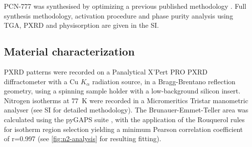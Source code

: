 PCN-777 was synthesised by optimizing a previous published methodology
\citep{fengHighlyStableZeotype2015}. Full synthesis methodology, activation
procedure and phase purity analysis using TGA, PXRD and  physisorption
are given in the SI.

\subsection{Material characterization}\label{methodology-characterization}

PXRD patterns were recorded on a Panalytical X'Pert PRO PXRD diffractometer with
a Cu \(K_{\alpha}\) radiation source, in a Bragg-Brentano reflection geometry,
using a spinning sample holder with a low-background silicon insert. Nitrogen
isotherms at \SI{77}{\kelvin} were recorded in a Micromeritics Tristar
manometric analyser (see SI for detailed methodology). The Brunauer-Emmet-Teller
area was calculated using the pyGAPS suite
\citep{iacomiPyGAPSPythonbasedFramework2019}, with the application of the
Rouquerol rules for isotherm region selection yielding a minimum Pearson
correlation coefficient of r=0.997 (see \cref{fig:n2-analysis} for resulting
fitting).
